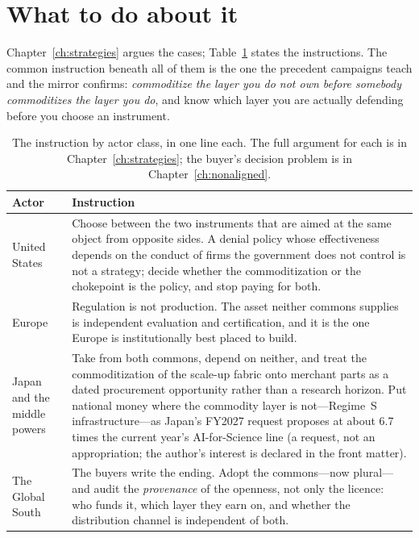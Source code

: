 \section{What to do about it}
\label{sec:summary-actions}

Chapter~\ref{ch:strategies} argues the cases; Table~\ref{tab:summary-actions} states the instructions. The common instruction beneath all of them is the one the precedent campaigns teach and the mirror confirms: \emph{commoditize the layer you do not own before somebody commoditizes the layer you do}, and know which layer you are actually defending before you choose an instrument.

\begin{table}[htbp]
\centering\footnotesize
\caption{The instruction by actor class, in one line each. The full argument for each is in Chapter~\ref{ch:strategies}; the buyer's decision problem is in Chapter~\ref{ch:nonaligned}.}
\label{tab:summary-actions}
\begin{tabular}{@{}p{28mm}p{118mm}@{}}
\toprule
\textbf{Actor} & \textbf{Instruction} \\
\midrule
United States & Choose between the two instruments that are aimed at the same object from opposite sides. A denial policy whose effectiveness depends on the conduct of firms the government does not control is not a strategy; decide whether the commoditization or the chokepoint is the policy, and stop paying for both. \\
\addlinespace
Europe & Regulation is not production. The asset neither commons supplies is independent evaluation and certification, and it is the one Europe is institutionally best placed to build. \\
\addlinespace
Japan and the middle powers & Take from both commons, depend on neither, and treat the commoditization of the scale-up fabric onto merchant parts as a dated procurement opportunity rather than a research horizon. Put national money where the commodity layer is not---Regime~S infrastructure---as Japan's FY2027 request proposes at about 6.7 times the current year's AI-for-Science line (a request, not an appropriation; the author's interest is declared in the front matter). \\
\addlinespace
The Global South & The buyers write the ending. Adopt the commons---now plural---and audit the \emph{provenance} of the openness, not only the licence: who funds it, which layer they earn on, and whether the distribution channel is independent of both. \\

\end{tabular}
\end{table}
